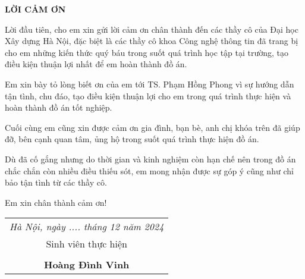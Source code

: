 \documentclass[../index.tex]{subfiles}
\begin{document}
    \newpage
    \begin{center}
        \Large{\textbf{LỜI CẢM ƠN}}\\
    \end{center}
    \vspace{1cm}
    Lời đầu tiên, cho em xin gửi lời cảm ơn chân thành đến các thầy cô của Đại
    học Xây dựng Hà Nội, đặc biệt là các thầy cô khoa Công nghệ thông tin đã trang
    bị cho em những kiến thức quý báu trong suốt quá trình học tập tại trường,
    tạo điều kiện thuận lợi nhất để em hoàn thành đồ án.

    Em xin bày tỏ lòng biết ơn của em tới TS. Phạm Hồng Phong vì sự hướng dẫn tận
    tình, chu đáo, tạo điều kiện thuận lợi cho em trong quá trình thực hiện và hoàn
    thành đồ án tốt nghiệp.

    Cuối cùng em cũng xin được cảm ơn gia đình, bạn bè, anh chị khóa trên đã giúp
    đỡ, bên cạnh quan tâm, ủng hộ trong suốt quá trình thực hiện đồ án.

    Dù đã cố gắng nhưng do thời gian và kinh nghiệm còn hạn chế nên trong đồ án chắc
    chắn còn nhiều điều thiếu sót, em mong nhận được sự góp ý cũng như chỉ bảo
    tận tình từ các thầy cô.

    Em xin chân thành cảm ơn!

    \begin{flushright}
        \begin{tabular}{@{}c@{}}
            \textit{Hà Nội, ngày .... tháng 12 năm 2024} \\
            {Sinh viên thực hiện}                        \\
            \vspace{1.5cm}                               \\
            \textbf{Hoàng Đình Vinh}
        \end{tabular}
    \end{flushright}
\end{document}
